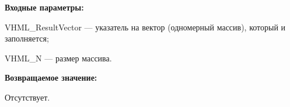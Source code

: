 \textbf{Входные параметры:}

 VHML\_ResultVector --- указатель на вектор (одномерный массив), который и заполняется;
 
 VHML\_N --- размер массива.

\textbf{Возвращаемое значение:}

Отсутствует.